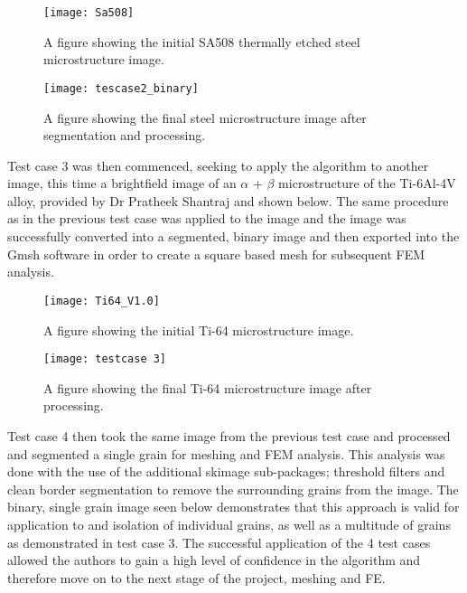 \documentclass[\report.tex]{subfiles}
\begin{document}
\begin{figure}
  \centering
  \begin{minipage}[!htb]{.5\textwidth}
    \centering\captionsetup{width=.8\linewidth}%
    \texttt{[image: Sa508]}
    \caption{A figure showing the initial SA508 thermally etched steel microstructure image.}\label{fig:SA508}
  \end{minipage}%
  \begin{minipage}[!htb]{.5\textwidth}
    \centering\captionsetup{width=.8\linewidth}%
    \texttt{[image: tescase2\_binary]}
    \caption{A figure showing the final steel microstructure image after segmentation and processing.}\label{fig:SA508_2}
  \end{minipage}
\end{figure}

\noindent Test case 3 was then commenced, seeking to apply the algorithm to another image, this time a brightfield image of an $\alpha$ + $\beta$ microstructure of the Ti-6Al-4V alloy, provided by Dr Pratheek Shantraj and shown below. The same procedure as in the previous test case was applied to the image and the image was successfully converted into a segmented, binary image and then exported into the Gmsh software in order to create a square based mesh for subsequent FEM analysis.

\begin{figure}
  \centering
  \begin{minipage}[!htb]{.5\textwidth}
    \centering\captionsetup{width=.8\linewidth}%
    \texttt{[image: Ti64\_V1.0]}
    \caption{A figure showing the initial Ti-64 microstructure image.}\label{fig:Ti64initial}
  \end{minipage}%
  \begin{minipage}[!htb]{.5\textwidth}
    \centering\captionsetup{width=.8\linewidth}%
    \texttt{[image: testcase 3]}
    \caption{A figure showing the final Ti-64 microstructure image after processing.}\label{fig:Ti64_2}
  \end{minipage}
\end{figure}

\noindent Test case 4 then took the same image from the previous test case and processed and segmented a single grain for meshing and FEM analysis. This analysis was done with the use of the additional skimage sub-packages; threshold filters and clean border segmentation to remove the surrounding grains from the image. The binary, single grain image seen below demonstrates that this approach is valid for application to and isolation of individual grains, as well as a multitude of grains as demonstrated in test case 3. The successful application of the 4 test cases allowed the authors to gain a high level of confidence in the algorithm and therefore move on to the next stage of the project, meshing and FE.\\
\end{document}
